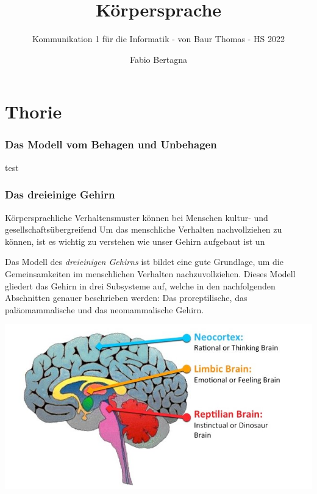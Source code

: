 \documentclass[
    invert-title=false,
    titlepage=true,
    titleimage-ratio=1011,
    parskip=half-,
]{bfhpub}                %
\title{Körpersprache}
\subtitle{Kommunikation 1 für die Informatik - von Baur Thomas - HS 2022}
\author{Fabio Bertagna}
\institute{Kommunikation 1 für die Informatik}
\begin{document}
    \maketitle
    \tableofcontents

    

    \part{Thorie}
    \section{Das Modell vom Behagen und Unbehagen}\label{sec:das-modell-vom-behagen-und-unbehagen}
    test\cite{menschen_verstehen_und_lenken,menschen_lesen}

    \section{Das dreieinige Gehirn}\label{sec:das-dreieinige-gehirn}
    Körpersprachliche Verhaltensmuster können bei Menschen kultur- und gesellschaftsübergreifend
    Um das menschliche Verhalten nachvollziehen zu können, ist es wichtig zu verstehen wie unser Gehirn aufgebaut ist un

    Das Modell des \textit{dreieinigen Gehirns} ist bildet eine gute Grundlage, um die Gemeinsamkeiten im menschlichen Verhalten nachzuvollziehen.
    Dieses Modell gliedert das Gehirn in drei Subsysteme auf, welche in den nachfolgenden Abschnitten genauer beschrieben werden:
    Das proreptilische, das paläomammalische und das neomammalische Gehirn.

    \includegraphics[width=\textwidth]{images/brain}
\end{document}
